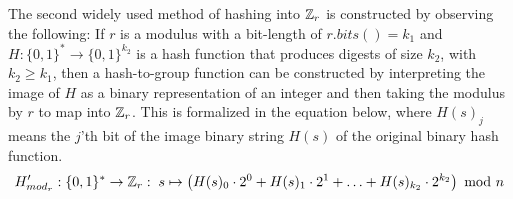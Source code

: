 The second widely used method of hashing into $\mathbb{Z}_r$ is constructed by observing the following: If $r$ is a modulus with a bit-length of $r.bits()=k_1$ and $H:\{0,1\}^*\to \{0,1\}^{k_2}$ is a hash function that produces digests of size $k_2$, with $k_2\geq k_1$, then a hash-to-group function can be constructed by interpreting the image of $H$ as a binary representation of an integer and then taking the modulus by $r$ to map into $\mathbb{Z}_r$. This is formalized in the equation below, where $H(s)_j$ means the $j$'th bit of the image binary string $H(s)$ of the original binary hash function.
\begin{equation}
H'_{mod_r}: \{0,1\}^* \to \mathbb{Z}_r: \; s \mapsto
\left(H(s)_0\cdot 2^0 + H(s)_1\cdot 2^1 + \ldots + H(s)_{k_2}\cdot 2^{k_2}\right) \text{ mod } n
\end{equation}


